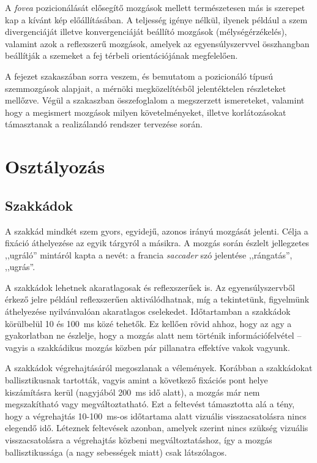 A \emph{fovea} pozicionálását elősegítő mozgások mellett természetesen más is szerepet kap a kívánt kép előállításában. A teljesség igénye nélkül, ilyenek például a szem divergenciáját illetve konvergenciáját beállító mozgások (mélységérzékelés), valamint azok a reflexszerű mozgások, amelyek az egyensúlyszervvel összhangban beállítják a szemeket a fej térbeli orientációjának megfelelően.

\bigskip

A fejezet  szakaszában sorra veszem, és bemutatom a pozicionáló típusú szemmozgások alapjait, a mérnöki megközelítésből jelentéktelen részleteket mellőzve. Végül a  szakaszban összefoglalom a megszerzett ismereteket, valamint hogy a megismert mozgások milyen követelményeket, illetve korlátozásokat támasztanak a realizálandó rendszer tervezése során.

\section{Osztályozás}\label{sect:osztalyok}

\subsection{Szakkádok}\label{sect:szakkadok}

A szakkád mindkét szem gyors, egyidejű, azonos irányú mozgását jelenti. Célja a fixáció áthelyezése az egyik tárgyról a másikra. A mozgás során észlelt jellegzetes ,,ugráló'' mintáról kapta a nevét: a francia \emph{saccader} szó jelentése ,,rángatás'', ,,ugrás''.

A szakkádok lehetnek akaratlagosak és reflexszerűek is. Az egyensúlyszervből érkező jelre például reflexszerűen aktiválódhatnak, míg a tekintetünk, figyelmünk áthelyezése nyilvánvalóan akaratlagos cselekedet. Időtartamban a szakkádok körülbelül 10 és 100~ms közé tehetők. Ez kellően rövid ahhoz, hogy az agy a gyakorlatban ne észlelje, hogy a mozgás alatt nem történik információfelvétel -- vagyis a szakkádikus mozgás közben pár pillanatra effektíve vakok vagyunk. \cite{shebilske}

A szakkádok végrehajtásáról megoszlanak a vélemények. Korábban a szakkádokat ballisztikusnak tartották, vagyis amint a következő fixációs pont helye kiszámításra kerül (nagyjából 200~ms idő alatt), a mozgás már nem megszakítható vagy megváltoztatható. \cite{carpenter_book} Ezt a feltevést támasztotta alá a tény, hogy a végrehajtás 10-100~ms-os időtartama alatt vizuális visszacsatolásra nincs elegendő idő. Léteznek feltevések azonban, amelyek szerint nincs szükség vizuális visszacsatolásra a végrehajtás közbeni megváltoztatáshoz, így a mozgás ballisztikussága (a nagy sebességek miatt) csak látszólagos. \cite{zee}

